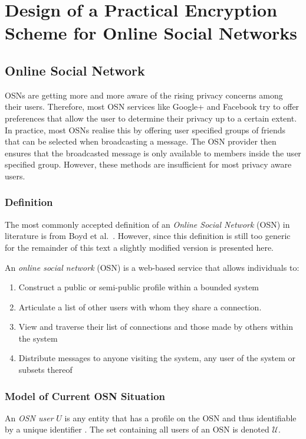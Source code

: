 \chapter{Design of a Practical Encryption Scheme for Online Social Networks}
\label{cha:n}

\section{Online Social Network}
OSNs are getting more and more aware of the rising privacy concerns among their users. Therefore, most OSN services like Google+ and Facebook try to offer preferences that allow the user to determine their privacy up to a certain extent. In practice, most OSNs realise this by offering user specified groups of friends that can be selected when broadcasting a message. The OSN provider then ensures that the broadcasted message is only available to members inside the user specified group. However, these methods are insufficient for most privacy aware users.

\subsection{Definition}
The most commonly accepted definition of an \textit{Online Social Network} (OSN) in literature is from Boyd et al.~\cite{art:BoydE08}. However, since this definition is still too generic for the remainder of this text a slightly modified version is presented here.

\begin{defn}
\label{def:osn_boyd}
 An \textit{online social network} (OSN) is a web-based service that allows individuals to:
 \begin{enumerate}
  \item Construct a public or semi-public profile within a bounded system
  \item Articulate a list of other users with whom they share a connection.
  \item View and traverse their list of connections and those made by others within the system
  \item Distribute messages to anyone visiting the system, any user of the system or subsets thereof 
  \setcounter{enumTemp}{\theenumi}
 \end{enumerate}
\end{defn}


\subsection{Model of Current OSN Situation}
\label{sec:model}
\begin{defn}
\label{def:user}
 An \textit{OSN user} $U$ is any entity that has a profile on the OSN and thus identifiable by a unique identifier . The set containing all users of an OSN is denoted $\mathcal{U}$.
\end{defn}

